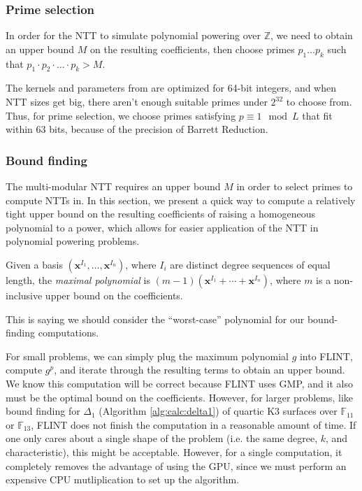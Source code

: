 \subsubsection{Prime selection}
In order for the NTT to simulate polynomial powering over $\mathbb{Z}$, 
we need to obtain an upper bound $M$ 
on the resulting coefficients, then 
choose primes $p_1 \dots p_k$ such 
that $p_1 \cdot p_2 \cdot ... \cdot p_k > M$.

The kernels and parameters from \cite{ozcan-2023-fft} are 
optimized for 64-bit integers, and when NTT sizes get big, there 
aren't enough suitable primes under $2^{32}$ to choose from.
Thus, for prime selection, 
we choose primes satisfying $p \equiv 1 \mod L$ that fit 
within 63 bits, because of the precision of Barrett Reduction.

\subsubsection{Bound finding}
The multi-modular NTT requires an upper bound $M$ in order to select primes 
to compute NTTs in. In this section, we present a quick way to compute a 
relatively tight upper bound on the resulting 
coefficients of raising a homogeneous polynomial to a power, which
allows for easier application of the NTT in polynomial powering
problems.

\begin{defn}
    Given a basis $(\mathbf{x}^{I_1}, \dots, \mathbf{x}^{I_n})$, 
    where $I_i$ are distinct degree sequences of equal 
    length, the \textit{maximal polynomial} is 
    $(m - 1)(\mathbf{x}^{I_1} + \cdots + \mathbf{x}^{I_n})$, 
    where $m$ is a non-inclusive upper bound on the coefficients.
\end{defn}

This is saying we should consider the ``worst-case'' polynomial 
for our bound-finding computations.

For small problems, we can simply plug the maximum 
polynomial $g$ into FLINT, compute $g ^ p$, and 
iterate through the resulting terms to obtain an upper bound.
We know this computation will be correct because FLINT uses GMP,
and it also must be the optimal bound on the coefficients. 
However, for larger problems, like bound finding for 
$\Delta_1$ (Algorithm \ref{alg:calc:delta1}) of
quartic K3 surfaces over $\mathbb{F}_{11}$ or $\mathbb{F}_{13}$, 
FLINT does not finish the computation in a reasonable amount of time.
If one only cares about a single shape of the problem 
(i.e. the same degree, \(k\), and characteristic),
this might be acceptable.
However, for a single computation, it completely removes 
the advantage of using the GPU, since we must perform an 
expensive CPU mutliplication to set up the algorithm.

